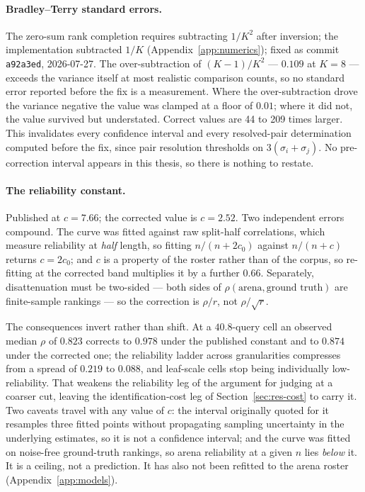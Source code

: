 \paragraph{Bradley--Terry standard errors.} The zero-sum rank completion
requires subtracting $1/K^{2}$ after inversion; the implementation subtracted
$1/K$ (Appendix~\ref{app:numerics}); fixed as commit \texttt{a92a3ed},
2026-07-27. The over-subtraction of $(K-1)/K^{2}$ ---
$0.109$ at $K = 8$ --- exceeds the variance itself at most realistic comparison
counts, so no standard error reported before the fix is a measurement. Where the
over-subtraction drove the variance negative the value was clamped at a floor of
$0.01$; where it did not, the value survived but understated. Correct values are
44 to 209 times larger. This invalidates every confidence interval and every
resolved-pair determination computed before the fix, since pair resolution
thresholds on $3(\sigma_i + \sigma_j)$. No pre-correction interval appears in
this thesis, so there is nothing to restate.

\paragraph{The reliability constant.} Published at $c = 7.66$; the corrected
value is $c = 2.52$. Two independent errors compound. The curve was fitted
against raw split-half correlations, which measure reliability at \emph{half}
length, so fitting $n/(n + 2c_0)$ against $n/(n + c)$ returns $c = 2c_0$; and
$c$ is a property of the roster rather than of the corpus, so re-fitting at the
corrected band multiplies it by a further $0.66$. Separately, disattenuation
must be two-sided --- both sides of $\rho(\text{arena}, \text{ground truth})$
are finite-sample rankings --- so the correction is $\rho / r$, not
$\rho / \sqrt{r}$.

The consequences invert rather than shift. At a $40.8$-query cell an observed
median $\rho$ of $0.823$ corrects to $0.978$ under the published constant and to
$0.874$ under the corrected one; the reliability ladder across granularities
compresses from a spread of $0.219$ to $0.088$, and leaf-scale cells stop being
individually low-reliability. That weakens the reliability leg of the argument
for judging at a coarser cut, leaving the identification-cost leg of
Section~\ref{sec:res-cost} to carry it. Two caveats travel with any value of
$c$: the interval originally quoted for it resamples three fitted points without
propagating sampling uncertainty in the underlying estimates, so it is not a
confidence interval; and the curve was fitted on noise-free ground-truth
rankings, so arena reliability at a given $n$ lies \emph{below} it. It is a
ceiling, not a prediction. It has also not been refitted to the arena roster
(Appendix~\ref{app:models}).

